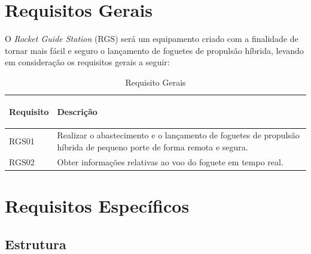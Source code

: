 \section{Requisitos Gerais}
\par O \textit{Rocket Guide Station} (RGS) será um equipamento criado com a finalidade de tornar mais fácil e seguro o lançamento de foguetes de propulsão híbrida, levando em consideração os requisitos gerais a seguir:

\begin{table}[H]

\begin{tabular}{ | m{2cm} | m{12cm}|} 
 \hline
 \textbf {Requisito} & \begin{center}\textbf{Descrição} 
 \end{center}\\ 
 \hline
 RGS01 & Realizar o abastecimento e o lançamento de foguetes de propulsão híbrida de pequeno porte de forma remota e segura. \\ 
 \hline
 RGS02 & Obter informações relativas ao voo do foguete em tempo real.	 \\ 
 \hline
\end{tabular}
\caption{Requisito Gerais}
\label{Requisito Gerais}
\end{table}

\section{Requisitos Específicos}
\subsection{Estrutura}


